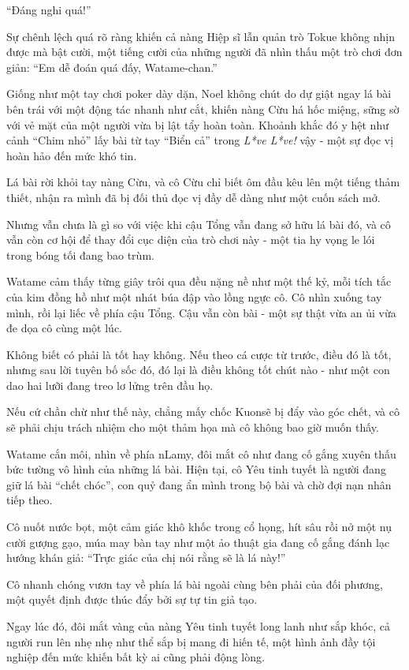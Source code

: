 \documentclass[../main.tex]{subfiles}
\begin{document}
``Đáng nghi quá!''

Sự chênh lệch quá rõ ràng khiến cả nàng Hiệp sĩ lẫn quản trò Tokue không nhịn được mà bật cười, một tiếng cười của những người đã nhìn thấu một trò chơi đơn giản: ``Em dễ đoán quá đấy, Watame-chan.''

Giống như một tay chơi poker dày dặn, Noel không chút do dự giật ngay lá bài bên trái với một động tác nhanh như cắt, khiến nàng Cừu há hốc miệng, sững sờ với vẻ mặt của một người vừa bị lật tẩy hoàn toàn. Khoảnh khắc đó y hệt như cảnh ``Chim nhỏ'' lấy bài từ tay ``Biển cả'' trong \textit{L*ve L*ve!} vậy - một sự đọc vị hoàn hảo đến mức khó tin.

Lá bài rời khỏi tay nàng Cừu, và cô Cừu chỉ biết ôm đầu kêu lên một tiếng thảm thiết, nhận ra mình đã bị đối thủ đọc vị đầy dễ dàng như một cuốn sách mở.

Nhưng vẫn chưa là gì so với việc khi cậu Tổng vẫn đang sở hữu lá bài đó, và cô vẫn còn cơ hội để thay đổi cục diện của trò chơi này - một tia hy vọng le lói trong bóng tối đang bao trùm.

\il

Watame cảm thấy từng giây trôi qua đều nặng nề như một thế kỷ, mỗi tích tắc của kim đồng hồ như một nhát búa đập vào lồng ngực cô. Cô nhìn xuống tay mình, rồi lại liếc về phía cậu Tổng. Cậu vẫn còn bài - một sự thật vừa an ủi vừa đe dọa cô cùng một lúc.

Không biết có phải là tốt hay không. Nếu theo cá cược từ trước, điều đó là tốt, nhưng sau lời tuyên bố sốc đó, đó lại là điều không tốt chút nào - như một con dao hai lưỡi đang treo lơ lửng trên đầu họ.

Nếu cứ chần chừ như thế này, chẳng mấy chốc Kuonsẽ bị đẩy vào góc chết, và cô sẽ phải chịu trách nhiệm cho một thảm họa mà cô không bao giờ muốn thấy.

Watame cắn môi, nhìn về phía nLamy, đôi mắt cô như đang cố gắng xuyên thấu bức tường vô hình của những lá bài. Hiện tại, cô Yêu tinh tuyết là người đang giữ lá bài ``chết chóc'', con quỷ đang ẩn mình trong bộ bài và chờ đợi nạn nhân tiếp theo.

Cô nuốt nước bọt, một cảm giác khô khốc trong cổ họng, hít sâu rồi nở một nụ cười gượng gạo, múa may bàn tay như một ảo thuật gia đang cố gắng đánh lạc hướng khán giả: ``Trực giác của chị nói rằng sẽ là lá này!''

Cô nhanh chóng vươn tay về phía lá bài ngoài cùng bên phải của đối phương, một quyết định được thúc đẩy bởi sự tự tin giả tạo.

Ngay lúc đó, đôi mắt vàng của nàng Yêu tinh tuyết long lanh như sắp khóc, cả người run lên nhẹ nhẹ như thể sắp bị mang đi hiến tế, một hình ảnh đầy tội nghiệp đến mức khiến bất kỳ ai cũng phải động lòng.
\end{document}
